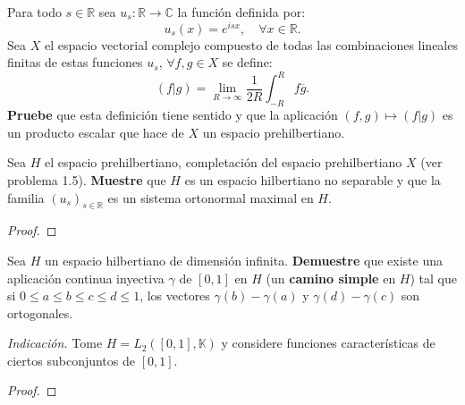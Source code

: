 \documentclass[12pt]{report}
\theoremstyle{largebreak}
\newcommand\cf[3]{\ensuremath{#1:#2\rightarrow#3}}
\newcommand\pint[2]{\ensuremath{\left(#1\big|#2\right)}}
\newcommand\conj[1]{\ensuremath{\overline{#1}}}
\begin{document}
    \begin{sol}
        
    \end{sol}

    \begin{excer}
        Para todo $s\in\mathbb{R}$ sea $\cf{u_s}{\mathbb{R}}{\mathbb{C}}$ la función definida por:
        \begin{equation*}
            u_s(x)=e^{isx},\quad\forall x\in\mathbb{R}.
        \end{equation*}
        Sea $X$ el espacio vectorial complejo compuesto de todas las combinaciones lineales finitas de estas funciones $u_s$, $\forall f,g\in X$ se define:
        \begin{equation*}
            \pint{f}{g}=\lim_{R\rightarrow\infty}\frac{1}{2R}\int_{-R}^Rf\conj{g}.
        \end{equation*}
        \textbf{Pruebe} que esta definición tiene sentido y que la aplicación $(f,g)\mapsto\pint{f}{g}$ es un producto escalar que hace de $X$ un espacio prehilbertiano.

        Sea $H$ el espacio prehilbertiano, completación del espacio prehilbertiano $X$ (ver problema 1.5). \textbf{Muestre} que $H$ es un espacio hilbertiano no separable y que la familia $\left(u_s\right)_{s\in\mathbb{R}}$ es un sistema ortonormal maximal en $H$.
    \end{excer}

    \begin{proof}
        
    \end{proof}

    \begin{excer}
        Sea $H$ un espacio hilbertiano de dimensión infinita. \textbf{Demuestre} que existe una aplicación continua inyectiva $\gamma$ de $[0,1]$ en $H$ (un \textbf{camino simple} en $H$) tal que si $0\leq a\leq b\leq c\leq d\leq 1$, los vectores $\gamma(b)-\gamma(a)$ y $\gamma(d)-\gamma(c)$ son ortogonales.

        \textit{Indicación.} Tome $H=L_2([0,1],\mathbb{K})$ y considere funciones características de ciertos subconjuntos de $[0,1]$.
    \end{excer}

    \begin{proof}
        
    \end{proof}
\end{document}
